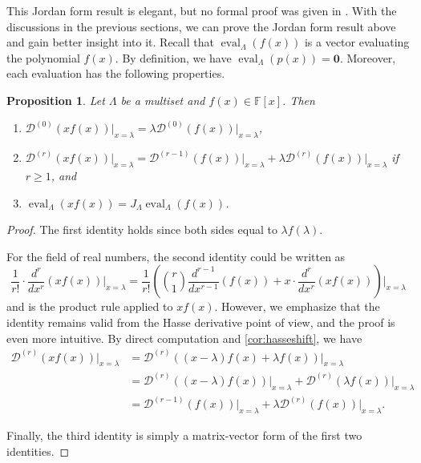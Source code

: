 \documentclass{article}
\newtheorem{proposition}[theorem]{Proposition}
\theoremstyle{definition}
\newcommand{\bzero}{\mathbf{0}}
\newcommand{\eval}{\operatorname{eval}}
\begin{document}
This Jordan form result is elegant, but no formal proof was given in \cite{AT32}.
With the discussions in the previous sections, 
we can prove the Jordan form result above and gain better insight into it.  
Recall that $\eval_\Lambda(f(x))$ is a vector evaluating the polynomial $f(x)$.  
By definition, we have $\eval_\Lambda(p(x)) = \bzero$.  Moreover, each evaluation has the following properties.  

\begin{proposition}
\label{prop:prodrule}
Let $\Lambda$ be a multiset and $f(x)\in {\mathbb F}[x]$. Then
\begin{enumerate}
    \item $\mathcal{D}^{(0)}(xf(x))\big|_{x = \lambda} = \lambda \mathcal{D}^{(0)}(f(x))\big|_{x = \lambda}$, 
    \item $\mathcal{D}^{(r)}(xf(x))\big|_{x = \lambda} = \mathcal{D}^{(r-1)}(f(x))\big|_{x = \lambda} + \lambda \mathcal{D}^{(r)}(f(x))\big|_{x = \lambda}$ if $r \geq 1$, and   
    \item $\eval_\Lambda(xf(x)) = J_\Lambda \eval_\Lambda(f(x))$.
\end{enumerate}
\end{proposition}
\begin{proof}
The first identity holds since both sides equal to $\lambda f(\lambda)$.  

For the field of real numbers, the second identity could be written as 
\[
    \frac{1}{r!}\cdot \frac{d^r}{dx^r} (xf(x))\Big|_{x = \lambda} = \frac{1}{r!}\left( \binom{r}{1}\frac{d^{r-1}}{dx^{r-1}} (f(x)) + x\cdot \frac{d^r}{dx^r} (xf(x)) \right)\Big|_{x = \lambda}
\]
and is the product rule applied to $xf(x)$.  However, we emphasize that the identity remains valid from the Hasse derivative point of view, and the proof is even more intuitive.  By direct computation and \cref{cor:hasseshift}, we have 
\[
    \begin{aligned}
        \mathcal{D}^{(r)}(xf(x))\big|_{x = \lambda} &= \mathcal{D}^{(r)}((x - \lambda)f(x) + \lambda f(x))\big|_{x = \lambda} \\
        &= \mathcal{D}^{(r)}((x - \lambda)f(x))\big|_{x = \lambda} + \mathcal{D}^{(r)}(\lambda f(x))\big|_{x = \lambda} \\
        &= \mathcal{D}^{(r-1)}(f(x))\big|_{x = \lambda} + \lambda\mathcal{D}^{(r)}(f(x))\big|_{x = \lambda}.
    \end{aligned}
\]

Finally, the third identity is simply a matrix-vector form of the first two identities.  
\end{proof}
\end{document}
